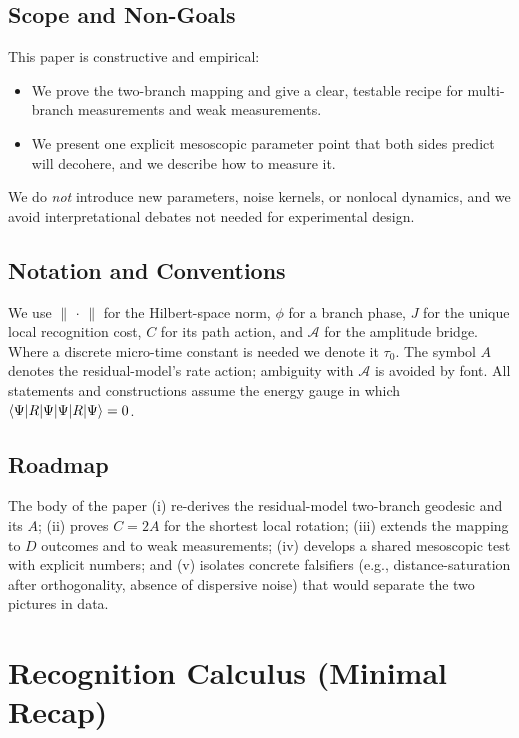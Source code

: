 \documentclass[11pt,letterpaper]{article}
\begin{document}
\subsection{Scope and Non-Goals}

This paper is constructive and empirical:
\begin{itemize}[leftmargin=*, itemsep=0.2em]
\item We prove the two-branch mapping and give a clear, testable recipe for multi-branch measurements and weak measurements.
\item We present one explicit mesoscopic parameter point that both sides predict will decohere, and we describe how to measure it.
\end{itemize}

We do \emph{not} introduce new parameters, noise kernels, or nonlocal dynamics, and we avoid interpretational debates not needed for experimental design.

\subsection{Notation and Conventions}

We use $\|\,\cdot\,\|$ for the Hilbert-space norm, $\phi$ for a branch phase, $J$ for the unique local recognition cost, $C$ for its path action, and $\mathcal{A}$ for the amplitude bridge. Where a discrete micro-time constant is needed we denote it $\tau_0$. The symbol $A$ denotes the residual-model's rate action; ambiguity with $\mathcal{A}$ is avoided by font. All statements and constructions assume the energy gauge in which $\braket{\Psi|R|\Psi}=0$.

\subsection{Roadmap}

The body of the paper (i) re-derives the residual-model two-branch geodesic and its $A$; (ii) proves $C=2A$ for the shortest local rotation; (iii) extends the mapping to $D$ outcomes and to weak measurements; (iv) develops a shared mesoscopic test with explicit numbers; and (v) isolates concrete falsifiers (e.g., distance-saturation after orthogonality, absence of dispersive noise) that would separate the two pictures in data.

\section{Recognition Calculus (Minimal Recap)}
\end{document}
